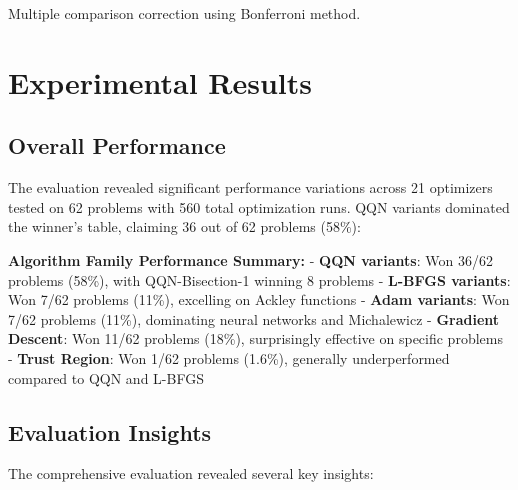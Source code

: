 Multiple comparison correction using Bonferroni method.

\hypertarget{experimental-results}{%
\section{Experimental Results}\label{experimental-results}}

\hypertarget{overall-performance}{%
\subsection{Overall Performance}\label{overall-performance}}

The evaluation revealed significant performance variations across 21 optimizers tested on 62 problems with 560 total optimization runs. QQN variants dominated the winner's table, claiming 36 out of 62 problems (58\%):

\textbf{Algorithm Family Performance Summary:}
- \textbf{QQN variants}: Won 36/62 problems (58\%), with QQN-Bisection-1 winning 8 problems
- \textbf{L-BFGS variants}: Won 7/62 problems (11\%), excelling on Ackley functions
- \textbf{Adam variants}: Won 7/62 problems (11\%), dominating neural networks and Michalewicz
- \textbf{Gradient Descent}: Won 11/62 problems (18\%), surprisingly effective on specific problems
- \textbf{Trust Region}: Won 1/62 problems (1.6\%), generally underperformed compared to QQN and L-BFGS

\hypertarget{evaluation-insights}{%
\subsection{Evaluation Insights}\label{evaluation-insights}}

The comprehensive evaluation revealed several key insights:

